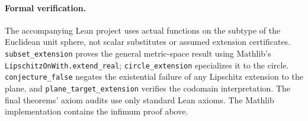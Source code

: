 \documentclass[11pt]{article}
\begin{document}
\paragraph{Formal verification.}\sloppy
The accompanying Lean project uses actual functions on the subtype of the Euclidean unit sphere, not scalar substitutes or assumed extension certificates. \texttt{subset\_extension} proves the general metric-space result using Mathlib's \texttt{LipschitzOnWith.extend\_real}; \texttt{circle\_extension} specializes it to the circle. \texttt{conjecture\_false} negates the existential failure of any Lipschitz extension to the plane, and \texttt{plane\_target\_extension} verifies the codomain interpretation. The final theorems' axiom audits use only standard Lean axioms. The Mathlib implementation contains the infimum proof above.
\end{document}
